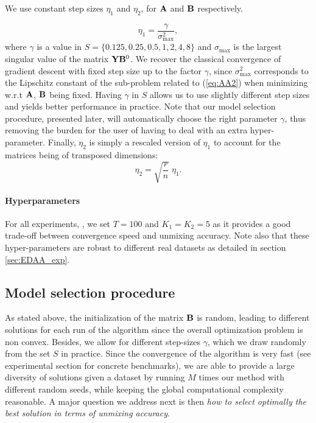 We use constant step sizes $\eta_1$ and $\eta_2$, for $\mathbf A$ and $\mathbf B$
respectively.

\begin{equation}
  \label{eq:eta0A}
  \eta_1 = \frac{\gamma}{\sigma^2_{\max}},
\end{equation}
where $\gamma$ is a value in $S = \{0.125, 0.25, 0.5, 1, 2, 4, 8\}$ and $\sigma_{\max}$ is the largest singular value of the matrix $\mathbf Y \mathbf B^0$.
We recover the classical convergence of gradient descent with fixed step size \cite{nesterov_introductory_2003} up
to the factor $\gamma$, since $\sigma^2_{\max}$ corresponds to the Lipschitz constant of the sub-problem
related to (\ref{eq:AA2}) when minimizing w.r.t $\mathbf A$, $\mathbf B$ being fixed.
Having $\gamma$ in $S$ allows us to use slightly different step sizes and yields better performance in practice. 
Note that our model selection procedure, presented later, will automatically choose the right parameter $\gamma$, thus removing the burden for the user of having to deal with an extra hyper-parameter.
Finally, $\eta_2$ is simply a rescaled version of $\eta_1$ to account for the matrices being of transposed dimensions:
\begin{equation}
  \label{eq:eta0B}
  \eta_2 = \sqrt{\frac{r}{n}} \; \eta_1.
\end{equation}

\paragraph{Hyperparameters}

For all experiments, , we set $T=100$ and $K_1 = K_2 = 5$ as it provides a good trade-off between convergence speed and unmixing accuracy. 
Note also that these hyper-parameters are robust to different real datasets as detailed in section \ref{sec:EDAA_exp}.

\subsection{Model selection procedure}

As stated above, the initialization of the matrix $\mathbf B$ is random, leading to different solutions for each run of the algorithm since the overall optimization problem is non convex. 
Besides, we allow for different step-sizes $\gamma$, which we draw randomly from the set $S$ in practice.
Since the convergence of the algorithm is very fast (see experimental section for concrete benchmarks), we are able to provide a large diversity of solutions given a dataset by running $M$ times our method with different random seeds, while keeping the global computational complexity reasonable.
A major question we address next is then \emph{how to select optimally the best solution in terms of unmixing accuracy}.

